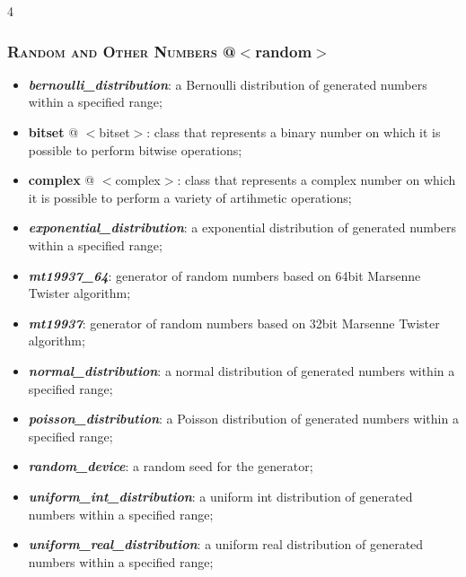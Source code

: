 \documentclass[10pt]{article}
\begin{document}
\begin{multicols*}{4}
{{\subsubsection*{\textsc{Random and Other Numbers}  @$<$random$>$} 
\begin{itemize}[leftmargin=*,topsep=0.25pt]
  \setlength\itemsep{-1.8pt}
\item  \emph{\textbf{bernoulli\_distribution}}: a Bernoulli distribution of generated numbers within a specified range; 
\item  \textbf{bitset} @ $<$bitset$>$: class that represents a binary number on which  it is possible to perform bitwise operations;
\item  \textbf{complex} @ $<$complex$>$: class that represents a complex number on which  it is possible to perform a variety of artihmetic operations;
\item  \emph{\textbf{exponential\_distribution}}: a exponential distribution of generated numbers within a specified range; 
\item  \emph{\textbf{mt19937\_64}}: generator of random numbers based on 64bit Marsenne Twister algorithm;  
\item  \emph{\textbf{mt19937}}: generator of random numbers based on 32bit Marsenne Twister algorithm;  
\item  \emph{\textbf{normal\_distribution}}: a normal distribution of generated numbers within a specified range; 
\item  \emph{\textbf{poisson\_distribution}}: a Poisson distribution of generated numbers within a specified range; 
\item  \emph{\textbf{random\_device}}: a random seed for the generator; 
\item  \emph{\textbf{uniform\_int\_distribution}}: a uniform int distribution of generated numbers within a specified range; 
\item  \emph{\textbf{uniform\_real\_distribution}}: a uniform real distribution of generated numbers within a specified range;

\end{itemize}

}}
\end{multicols*}
\end{document}
